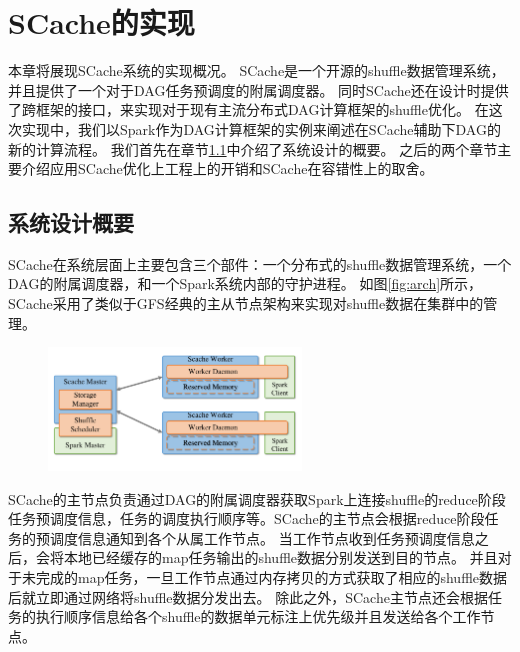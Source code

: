 
\chapter{SCache的实现}
\label{chap:impl}

本章将展现SCache系统的实现概况。
SCache是一个开源的shuffle数据管理系统，并且提供了一个对于DAG任务预调度的附属调度器。
同时SCache还在设计时提供了跨框架的接口，来实现对于现有主流分布式DAG计算框架的shuffle优化。
在这次实现中，我们以Spark作为DAG计算框架的实例来阐述在SCache辅助下DAG的新的计算流程。
我们首先在章节\ref{sec:overview}中介绍了系统设计的概要。
之后的两个章节主要介绍应用SCache优化上工程上的开销和SCache在容错性上的取舍。

\section{系统设计概要}
\label{sec:overview}

SCache在系统层面上主要包含三个部件：一个分布式的shuffle数据管理系统，一个DAG的附属调度器，和一个Spark系统内部的守护进程。
如图\ref{fig:arch}所示，SCache采用了类似于GFS\cite{gfs}经典的主从节点架构来实现对shuffle数据在集群中的管理。

\begin{figure}[!htp]
	\centering
	\includegraphics[width=0.6\textwidth]{../../PPoPP-2018/fig/arch.pdf}
\end{figure}

SCache的主节点负责通过DAG的附属调度器获取Spark上连接shuffle的reduce阶段任务预调度信息，任务的调度执行顺序等。SCache的主节点会根据reduce阶段任务的预调度信息通知到各个从属工作节点。
当工作节点收到任务预调度信息之后，会将本地已经缓存的map任务输出的shuffle数据分别发送到目的节点。
并且对于未完成的map任务，一旦工作节点通过内存拷贝的方式获取了相应的shuffle数据后就立即通过网络将shuffle数据分发出去。
除此之外，SCache主节点还会根据任务的执行顺序信息给各个shuffle的数据单元标注上优先级并且发送给各个工作节点。

